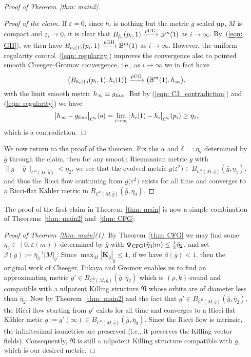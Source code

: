 \documentclass[pdftex]{sigma}
\numberwithin{equation}{section}
\begin{document}
\begin{proof}[Proof of Theorem~\ref{thm: main2}]
\begin{proof}[Proof of the claim]
If $\varepsilon=0$, since $\bar{h}_i$ is nothing but the metric $\bar{g}$ scaled
up, $M$ is compact and $\varepsilon_i\to 0$, it is clear that
$B_{\bar{h}_i}(p_i,1) \xrightarrow{p{\rm CG}} \mathbb{B}^m(1)$ as $i\to \infty$. By~(\ref{eqn: GH}), we then have $B_{h_i(1)}(p_i,1) \xrightarrow{p{\rm GH}}
\mathbb{B}^m(1)$ as $i\to \infty$. However, the uniform regularity control~(\ref{eqn: regularity}) improves the convergence also to pointed smooth
Cheeger--Gromov convergence, i.e., as $i\to \infty$ we in fact have
\begin{align*}
\big(B_{h_i(1)}(p_i,1),h_i(1)\big) \xrightarrow{p{\rm CG}} \big(\mathbb{B}^m(1),h_{\infty}\big),
\end{align*}
with the limit smooth metric $h_{\infty}\equiv g_{\rm Euc}$.
But by (\ref{eqn: C3_contradiction}) and (\ref{eqn: regularity}) we have
\begin{align*}
 \big|h_{\infty}-g_{\rm Euc} \big|_{C^k}(o) = \lim_{i\to\infty}
 \big|h_i(1)-\bar{h}_i \big|_{C^k}(p_i) \ge \bar{\eta}_1,
\end{align*}
which is a contradiction.
\end{proof}
We now return to the proof of the theorem. Fix the $\alpha$ and
$\delta=:\bar{\eta}_2$ determined by $\bar{g}$ through the claim,
then for any smooth Riemannian metric $g$ with $ \|g-\bar{g}
 \|_{C^0(M,\bar{g})}<\bar{\eta}_2$, we see that the evolved metric
$g\big(\varepsilon^2\big)\in B_{C^k(M,\bar{g})}(\bar{g},\bar{\eta}_1)$, and thus the
Ricci flow continuing from $g\big(\varepsilon^2\big)$ exists for all time and converges
to a Ricci-flat K\"ahler metric in $B_{C^k(M,\bar{g})}(\bar{g},\bar{\eta}_0)$.
\end{proof}

The proof of the first claim in Theorem~\ref{thm: main} is now a simple
combination of Theorems~\ref{thm: main2} and~\ref{thm: CFG}.
 \begin{proof}[Proof of Theorem~\ref{thm: main}(1)]
By Theorem~\ref{thm: CFG} we may find some $\bar{\eta}_3\in (0,\varepsilon(m))$
determined by $\bar{g}$ with $\Psi_{\rm CFG}(\bar{\eta}_3|m)\le
\frac{1}{2}\bar{\eta}_2$, and set $\beta(\bar{g}):= \bar{\eta}_3^{-1}|
M|_{\bar{g}}$. Since $\max_M\left|\mathbf{K}_{\bar{g}} \right|_{\bar{g}}\le 1$,
if we have $\beta(\bar{g})<1$, then the original work of Cheeger, Fukaya and
Gromov enables us to find an approximating metric $g' \in
B_{C^0(M,\bar{g})}\left(\bar{g}, \bar{\eta}_2\right)$ which is $(\rho,k)$-round
and compatible with a nilpotent Killing structure $\mathfrak{N}$ whose orbits
are of diameter less than $\bar{\eta}_2$. Now by Theorem~\ref{thm: main2} and
the fact that $g'\in B_{C^0(M,\bar{g})}(\bar{g}, \bar{\eta}_2)$, the Ricci flow
starting from $g'$ exists for all time and converges to a Ricci-flat K\"ahler
metic $g:=g'(\infty)\in B_{C^k(M,\bar{g})} (\bar{g},\bar{\eta}_0)$. Since the
Ricci flow is intrinsic, the infinitesimal isometries are preserved (i.e., it
preserves the Killing vector fields). Consequently, $\mathfrak{N}$ is still a
nilpotent Killing structure compatible with $g$, which is our desired metric.
\end{proof}
\end{document}
